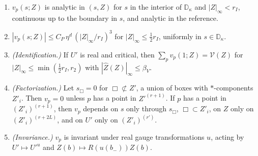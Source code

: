 \begin{proposition}\label{prop:interaction-pieces}
\begin{enumerate}[label=(\alph*)]
\item $v_p(s;Z)$ is analytic in $(s,Z)$ for $s$ in the interior of $\mathbb D_\kappa$ and $|Z|_\infty<r_I$, continuous up to the boundary in $s$, and analytic in the reference.
\item $|v_p(s;Z)|\le C_P\,\eta^d\,(|Z|_\infty/r_I)^3$ for $|Z|_\infty\le\frac12r_I$, uniformly in $s\in\mathbb D_\kappa$.
\item \emph{(Identification.)} If $U'$ is real and critical, then $\sum_pv_p(1;Z)=\mathcal V(Z)$ for $|Z|_\infty\le\min(\frac12r_I,r_2)$ with $|\hat Z(Z)|_\infty\le\beta_V$.
\item \emph{(Factorization.)} Let $s_\Box=0$ for $\Box\not\subset Z'$, a union of boxes with $*$-components $Z'_i$. Then $v_p=0$ unless $p$ has a point in $Z'^{(r+1)}$. If $p$ has a point in $(Z'_i)^{(r+1)}$, then $v_p$ depends on $s$ only through $s_\Box$, $\Box\subset Z'_i$, on $Z$ only on $(Z'_i)^{(r+2L)}$, and on $U'$ only on $(Z'_i)^{(r')}$.
\item \emph{(Invariance.)} $v_p$ is invariant under real gauge transformations $u$, acting by $U'\mapsto U'^u$ and $Z(b)\mapsto R(u(b_-))Z(b)$.
\end{enumerate}
\end{proposition}

